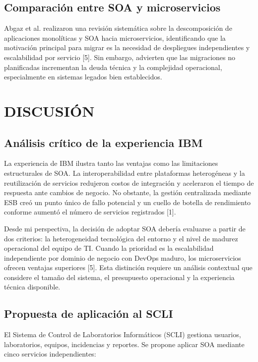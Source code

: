 \documentclass[conference]{IEEEtran}
\begin{document}
\subsection{Comparación entre SOA y microservicios}

Abgaz et al. realizaron una revisión sistemática sobre la descomposición de aplicaciones monolíticas y SOA hacia microservicios, identificando que la motivación principal para migrar es la necesidad de despliegues independientes y escalabilidad por servicio [5]. Sin embargo, advierten que las migraciones no planificadas incrementan la deuda técnica y la complejidad operacional, especialmente en sistemas legados bien establecidos.

\section{DISCUSIÓN}

\subsection{Análisis crítico de la experiencia IBM}

La experiencia de IBM ilustra tanto las ventajas como las limitaciones estructurales de SOA. La interoperabilidad entre plataformas heterogéneas y la reutilización de servicios redujeron costos de integración y aceleraron el tiempo de respuesta ante cambios de negocio. No obstante, la gestión centralizada mediante ESB creó un punto único de fallo potencial y un cuello de botella de rendimiento conforme aumentó el número de servicios registrados [1].

Desde mi perspectiva, la decisión de adoptar SOA debería evaluarse a partir de dos criterios: la heterogeneidad tecnológica del entorno y el nivel de madurez operacional del equipo de TI. Cuando la prioridad es la escalabilidad independiente por dominio de negocio con DevOps maduro, los microservicios ofrecen ventajas superiores [5]. Esta distinción requiere un análisis contextual que considere el tamaño del sistema, el presupuesto operacional y la experiencia técnica disponible.

\subsection{Propuesta de aplicación al SCLI}

El Sistema de Control de Laboratorios Informáticos (SCLI) gestiona usuarios, laboratorios, equipos, incidencias y reportes. Se propone aplicar SOA mediante cinco servicios independientes:
\end{document}
